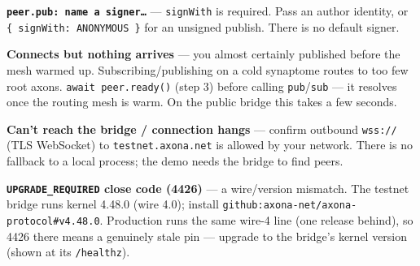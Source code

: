 \documentclass[
  nobib]{tufte-handout}
\begin{document}
\textbf{\texttt{peer.pub:\ name\ a\ signer…}} --- \texttt{signWith} is
required. Pass an author identity, or
\texttt{\{\ signWith:\ ANONYMOUS\ \}} for an unsigned publish. There is
no default signer.

\textbf{Connects but nothing arrives} --- you almost certainly published
before the mesh warmed up. Subscribing/publishing on a cold synaptome
routes to too few root axons. \texttt{await\ peer.ready()} (step 3)
before calling \texttt{pub}/\texttt{sub} --- it resolves once the
routing mesh is warm. On the public bridge this takes a few seconds.

\textbf{Can't reach the bridge / connection hangs} --- confirm outbound
\texttt{wss://} (TLS WebSocket) to \texttt{testnet.axona.net} is allowed
by your network. There is no fallback to a local process; the demo needs
the bridge to find peers.

\textbf{\texttt{UPGRADE\_REQUIRED} close code (4426)} --- a wire/version
mismatch. The testnet bridge runs kernel 4.48.0 (wire 4.0); install
\texttt{github:axona-net/axona-protocol\#v4.48.0}. Production runs the
same wire-4 line (one release behind), so 4426 there means a genuinely
stale pin --- upgrade to the bridge's kernel version (shown at its
\texttt{/healthz}).
\end{document}
